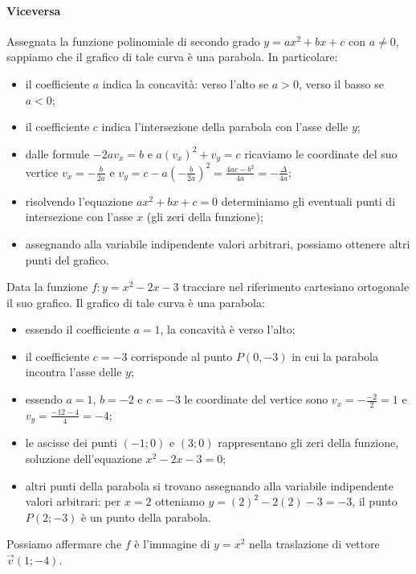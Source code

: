 \paragraph{Viceversa}
Assegnata la funzione polinomiale di secondo grado $y={ax}^2+{bx}+c$ con $a\neq 0$, sappiamo che il grafico di tale curva è una parabola. In particolare:
\begin{itemize}
\item il coefficiente $a$ indica la concavità: verso l’alto se $a>0$, verso il basso se $a<0$;
\item il coefficiente $c$ indica l'intersezione della parabola con l'asse delle $y$;
\item dalle formule $-2av_x=b$ e $a(v_x)^2+v_y=c$ ricaviamo le coordinate del suo vertice $v_x=-\frac b{2a}$ e $v_y=c-a\left(-\frac b{2a}\right)^2=\frac{4ac-b^2}{4a}=-\frac{\Delta }{4a}$;
\item risolvendo l’equazione ${ax}^2+{bx}+c=0$ determiniamo gli eventuali punti di intersezione con l’asse $x$ (gli zeri della funzione);
\item assegnando alla variabile indipendente valori arbitrari, possiamo ottenere altri punti del grafico.
\end{itemize}

\begin{exrig}
\begin{esempio}
Data la funzione $f: y=x^2-2x-3$ tracciare nel riferimento cartesiano ortogonale il suo grafico.
Il grafico di tale curva è una parabola:
\begin{itemize}
\item essendo il coefficiente $a=1$, la concavità è verso l’alto;
\item il coefficiente $c=-3$ corrisponde al punto $P(0,-3)$ in cui la parabola incontra l'asse delle $y$;
\item essendo $ a=1 $, $b=-2$ e $c=-3$ le coordinate del vertice sono $v_x=-\frac{-2} 2=1$ e $v_y=\frac{-12-4} 4=-4$;
\item le ascisse dei punti $(-1;0)$ e $(3;0)$ rappresentano gli zeri della funzione, soluzione dell'equazione $x^2-2x-3=0$;
\item altri punti della parabola si trovano assegnando alla variabile indipendente valori arbitrari: per $x=2$ otteniamo $y=(2)^2-2(2)-3=-3$, il punto $P(2;-3)$ è un punto della parabola.
\end{itemize}
Possiamo affermare che $f$ è l’immagine di $y=x^2$ nella traslazione di vettore $\vec v(1;-4)$.
\begin{center}
 
\end{center}
\end{esempio}
\end{exrig}
\vspazio\ovalbox{\risolvii \ref{ese:4.7}, \ref{ese:4.8}}
